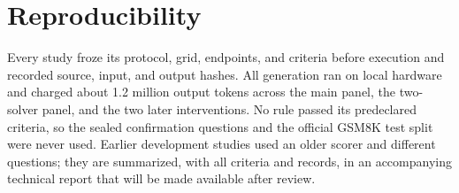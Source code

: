\documentclass[10pt,letterpaper]{article}
\begin{document}
\section{Reproducibility}

Every study froze its protocol, grid, endpoints, and criteria before execution and recorded source, input, and output hashes. All generation ran on local hardware and charged about 1.2 million output tokens across the main panel, the two-solver panel, and the two later interventions. No rule passed its predeclared criteria, so the sealed confirmation questions and the official GSM8K test split were never used. Earlier development studies used an older scorer and different questions; they are summarized, with all criteria and records, in an accompanying technical report that will be made available after review.
\end{document}
